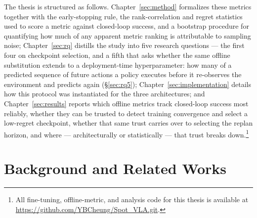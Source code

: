 \documentclass[english,12pt,a4paper,pdftex,elec,utf8]{aaltothesis}
\begin{document}
The thesis is structured as follows. Chapter~\ref{sec:method} formalizes these metrics together with the early-stopping rule, the rank-correlation and regret statistics used to score a metric against closed-loop success, and a bootstrap procedure for quantifying how much of any apparent metric ranking is attributable to sampling noise; Chapter~\ref{sec:rq} distills the study into five research questions --- the first four on checkpoint selection, and a fifth that asks whether the same offline substitution extends to a deployment-time hyperparameter: how many of a predicted sequence of future actions a policy executes before it re-observes the environment and predicts again (\S\ref{sec:rq5}); Chapter~\ref{sec:implementation} details how this protocol was instantiated for the three architectures; and Chapter~\ref{sec:results} reports which offline metrics track closed-loop success most reliably, whether they can be trusted to detect training convergence and select a low-regret checkpoint, whether that same trust carries over to selecting the replan horizon, and where --- architecturally or statistically --- that trust breaks down.\footnote{All fine-tuning, offline-metric, and analysis code for this thesis is available at \url{https://github.com/YBCheung/Spot_VLA.git}.}


\clearpage



\section{Background and Related Works}



\end{document}
